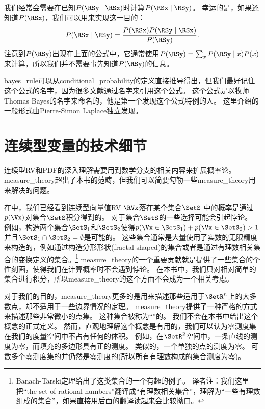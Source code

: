 \section{}
\label{sec:bayes_rule}

我们经常会需要在已知$P(\RSy \mid \RSx)$时计算$P(\RSx \mid \RSy)$。
幸运的是，如果还知道$P(\RSx)$，我们可以用来实现这一目的：
\begin{equation}
P(\RSx \mid \RSy) = \frac{P(\RSx) P(\RSy \mid \RSx)}{P(\RSy)}.
\end{equation}
注意到$P(\RSy)$出现在上面的公式中，它通常使用$P(\RSy) = \sum_x P(\RSy \mid x) P(x)$来计算，所以我们并不需要事先知道$P(\RSy)$的信息。

\gls{bayes_rule}可以从\gls{conditional_probability}的定义直接推导得出，但我们最好记住这个公式的名字，因为很多文献通过名字来引用这个公式。
这个公式是以牧师Thomas Bayes的名字来命名的，他是第一个发现这个公式特例的人。
这里介绍的一般形式由Pierre-Simon Laplace独立发现。

\section{连续型变量的技术细节}
\label{sec:technical_details_of_continuous_variables}

连续型\gls{RV}和\gls{PDF}的深入理解需要用到数学分支的相关内容来扩展概率论。
\gls{measure_theory}超出了本书的范畴，但我们可以简要勾勒一些\gls{measure_theory}用来解决的问题。

在中，我们已经看到连续型向量值\gls{RV} $\RVx$落在某个集合$\SetS$ 中的概率是通过$p(\Vx)$对集合$\SetS$积分得到的。
对于集合$\SetS$的一些选择可能会引起悖论。
例如，构造两个集合$\SetS_1$和$\SetS_2$使得$p(\Vx\in \SetS_1) + p(\Vx\in \SetS_2)>1$并且$\SetS_1 \cap \SetS_2 = \emptyset$是可能的。
这些集合通常是大量使用了实数的无限精度来构造的，例如通过构造分形形状(fractal-shaped)的集合或者是通过有理数相关集合的变换定义的集合。\footnote{Banach-Tarski定理给出了这类集合的一个有趣的例子。
译者注：我们这里把``the set of rational numbers''翻译成``有理数相关集合''，理解为``一些有理数组成的集合''，如果直接用后面的翻译读起来会比较拗口。}
\gls{measure_theory}的一个重要贡献就是提供了一些集合的个性刻画，使得我们在计算概率时不会遇到悖论。
在本书中，我们只对相对简单的集合进行积分，所以\gls{measure_theory}的这个方面不会成为一个相关考虑。


对于我们的目的，\gls{measure_theory}更多的是用来描述那些适用于$\SetR^n$上的大多数点，却不适用于一些边界情况的定理。
\gls{measure_theory}提供了一种严格的方式来描述那些非常微小的点集。
这种集合被称为``''的。
我们不会在本书中给出这个概念的正式定义。
然而，直观地理解这个概念是有用的，我们可以认为零测度集在我们的度量空间中不占有任何的体积。
例如，在$\SetR^2$空间中，一条直线的测度为零，而填充的多边形具有正的测度。
类似的，一个单独的点的测度为零。
可数多个零测度集的并仍然是零测度的(所以所有有理数构成的集合测度为零)。

